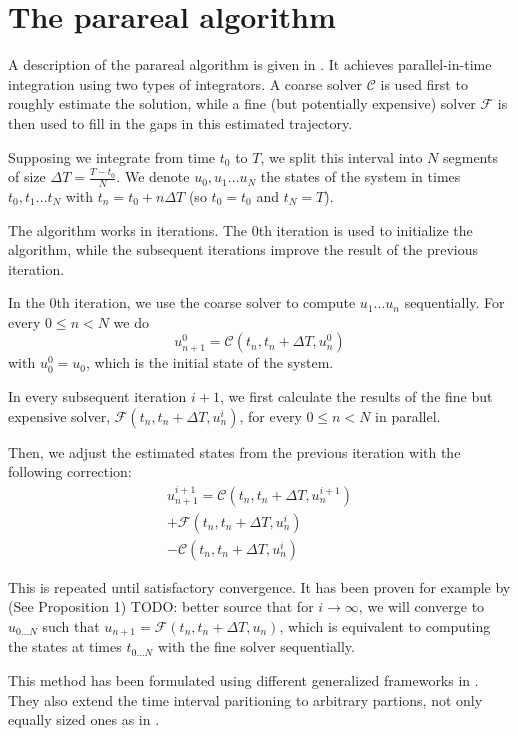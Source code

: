 \documentclass[conference]{IEEEtran}
\begin{document}
\section{The parareal algorithm}

A description of the parareal algorithm is given in \cite{parareal}. It achieves parallel-in-time integration using two types of integrators. A coarse solver $\mathcal{C}$ is used first to roughly estimate the solution, while a fine (but potentially expensive) solver $\mathcal{F}$ is then used to fill in the gaps in this estimated trajectory.

Supposing we integrate from time $t_0$ to $T$, we split this interval into $N$ segments of size $\Delta T = \frac{T-t_0}{N}$. We denote $u_0, u_1\dots u_N$ the states of the system in times $t_0, t_1\dots t_N$ with $t_n = t_0 + n\Delta T$ (so $t_0 = t_0$ and $t_N = T$).

The algorithm works in iterations. The 0th iteration is used to initialize the algorithm, while the subsequent iterations improve the result of the previous iteration.

In the 0th iteration, we use the coarse solver to compute $u_1\dots u_n$ sequentially. For every $0 \leq n < N$ we do
$$
u^0_{n+1} = \mathcal{C}(t_n, t_n+\Delta T, u^0_n)
$$
with $u^0_0 = u_0$, which is the initial state of the system.

In every subsequent iteration $i+1$, we first calculate the results of the fine but expensive solver, $\mathcal{F}(t_n, t_n+\Delta T, u^{i}_n)$, for every $0 \leq n < N$ in parallel.

Then, we adjust the estimated states from the previous iteration with the following correction:
\begin{multline}
u^{i+1}_{n+1} = \mathcal{C}(t_n, t_n+\Delta T, u^{i+1}_n)\\ + \mathcal{F}(t_n, t_n+\Delta T, u^i_n)\\ - \mathcal{C}(t_n, t_n+\Delta T, u^{i}_n)
\end{multline}

This is repeated until satisfactory convergence. It has been proven for example by \cite{parareal} (See Proposition 1) {\color{red} TODO: better source} that for $i \to \infty$, we will converge to $u_{0\dots N}$ such that $u_{n+1} = \mathcal{F}(t_n, t_n+\Delta T, u_n)$, which is equivalent to computing the states at times $t_{0\dots N}$ with the fine solver sequentially.

This method has been formulated using different generalized frameworks in \cite{parareal2}. They also extend the time interval paritioning to arbitrary partions, not only equally sized ones as in \cite{parareal}.
\end{document}
